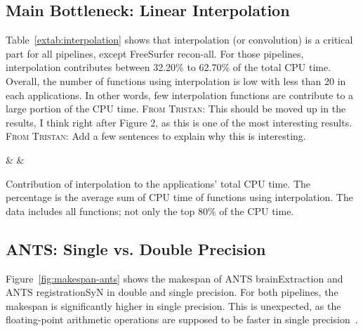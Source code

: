 \documentclass[conference]{IEEEtran}
\newcommand{\TG}[1]{\color{blue}\textsc{From Tristan: }#1\color{black}}
\begin{document}
\subsection{Main Bottleneck: Linear Interpolation}
Table~\ref{extab:interpolation} shows that interpolation (or convolution) is a critical part for all pipelines, except FreeSurfer recon-all. For those pipelines, interpolation contributes between 32.20\% to 62.70\% of the total CPU time. Overall, the number of functions using interpolation is low with less than 20 in each applications. In other words, few interpolation functions are contribute to a large portion of the CPU time. \TG{This should be moved up in the results, I think right after Figure 2, as this is one of the most interesting results.} \TG{Add a few sentences to explain why this is interesting.}
			
\begin{table}[ht]
	\centering
	{\pipeline & \nfunc & \tablenum[round-precision=2]{\cputime}}
	\caption{Contribution of interpolation to the applications' total CPU time. The percentage is the average sum of CPU time of functions using interpolation. The data includes all functions; not only the top 80\% of the CPU time.}
	\label{extab:interpolation}
\end{table}
						
						
\subsection{ANTS: Single vs. Double Precision}
Figure~\ref{fig:makespan-ants} shows the makespan of ANTS brainExtraction and ANTS registrationSyN in double and single precision. For both pipelines, the makespan is significantly higher in single precision. This is unexpected, as the floating-point arithmetic operations are supposed to be faster in single precision~\cite{Wang2018-jv}.
\end{document}
